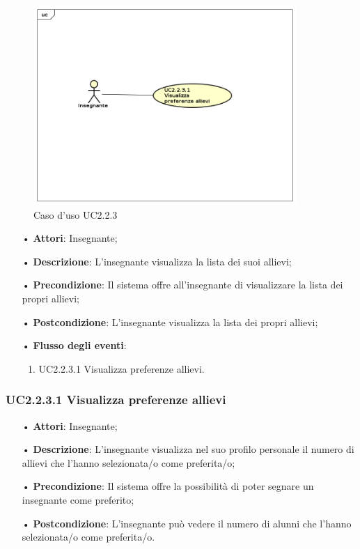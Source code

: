 \begin{figure}[H]
\centering
\includegraphics[width=10cm]{img/UC223.png} 
\caption{Caso d'uso UC2.2.3}
\end{figure}

\begin{itemize}
	\item[•] \textbf{Attori}: Insegnante;
	\item[•] \textbf{Descrizione}: L’insegnante visualizza la lista dei suoi allievi;
	\item[•] \textbf{Precondizione}: Il sistema offre all’insegnante di visualizzare la lista dei propri allievi;
	\item[•] \textbf{Postcondizione}: L’insegnante visualizza la lista dei propri allievi;
	\item[•] \textbf{Flusso degli eventi}:
		\begin{enumerate}
			\item UC2.2.3.1 Visualizza preferenze allievi.
		\end{enumerate}
\end{itemize}

\subsubsection{UC2.2.3.1 Visualizza preferenze allievi}
\begin{itemize}
	\item[•] \textbf{Attori}: Insegnante;
	\item[•] \textbf{Descrizione}: L’insegnante visualizza nel suo profilo personale il numero di allievi che l'hanno selezionata/o come preferita/o;
	\item[•] \textbf{Precondizione}: Il sistema offre la possibilità di poter segnare un insegnante come preferito;
	\item[•] \textbf{Postcondizione}: L’insegnante può vedere il numero di alunni che l'hanno selezionata/o come preferita/o.
\end{itemize}



